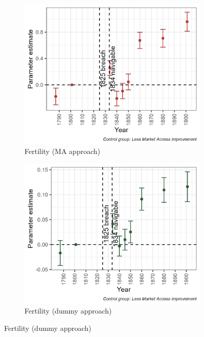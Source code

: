 \documentclass[11pt]{article}
\begin{document}
\begin{figure}
    \centering
    \caption{Effects on fertility and internal migration}
    \begin{subfigure}[b]{0.45\textwidth}
        \centering
        \caption{Fertility (MA approach)} \label{fig:fert_ma}
        \includegraphics[width=\textwidth]{Plots/Mechanism/fertility_MA.png}
    \end{subfigure}
    \hfill
    \begin{subfigure}[b]{0.45\textwidth}
        \centering
        \caption{Fertility (dummy approach)} \label{fig:fert_dummy}
        \includegraphics[width=\textwidth]{Plots/Mechanism/fertility_Dummy.png}

\end{subfigure}
\end{figure}
\end{document}
